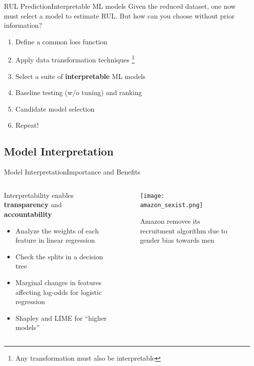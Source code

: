 \documentclass{beamer}
\begin{document}
            \begin{frame}{RUL Prediction}{Interpretable ML models}
                Given the reduced dataset, one now must select a model to estimate RUL. But how can you choose without prior information?
                \begin{enumerate}
                    \item Define a common loss function
                    \item Apply data transformation techniques \footnote{Any transformation must also be interpretable}
                    \item Select a suite of \textbf{interpretable} ML models
                    \item Baseline testing (w/o tuning) and ranking
                    \item Candidate model selection
                    \item Repeat!
                \end{enumerate}
            \end{frame}

        \subsection{Model Interpretation}
            \begin{frame}{Model Interpretation}{Importance and Benefits}

                \begin{columns}
                    \begin{column}{0.5\textwidth}
                        Interpretability enables \textbf{transparency} and \textbf{accountability}
                        \begin{itemize}
                            \item Analyze the weights of each feature in linear regression
                            \item Check the splits in a decision tree
                            \item Marginal changes in features affecting log-odds for logistic regression
                            \item Shapley and LIME for \enquote{higher models}
                        \end{itemize}
                    \end{column}
                    \begin{column}{0.5\textwidth}
                        \begin{figure}[!htbp]
                            \centering
                            \texttt{[image: amazon\_sexist.png]}
                            \caption{Amazon removes its recruitment algorithm due to gender bias towards men \cite{reporter-2018}}
                        \end{figure}
                    \end{column}
                \end{columns}
            \end{frame}
\end{document}
